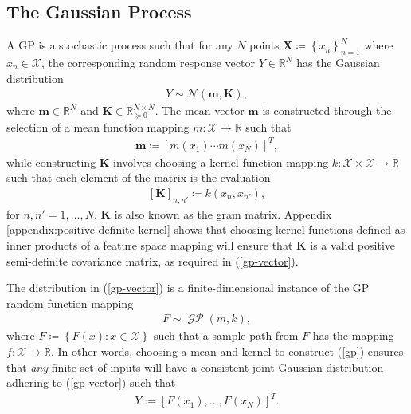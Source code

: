 \documentclass{article}
\newcommand{\GP}{\operatorname{\mathcal{GP}}}
\numberwithin{equation}{section}
\begin{document}
\subsection{The Gaussian Process}\label{section:the-gp}
A GP is a stochastic process such that for any $N$ points $\mathbf{X} \coloneqq \left\{ x_n\right\}_{n=1}^N$ where $x_n \in \mathcal{X}$, the corresponding random response vector $Y \in \mathbb{R}^N$ has the Gaussian distribution
\begin{align}
    \label{gp-vector}
    Y \sim \mathcal{N}\left(\mathbf{m}, \mathbf{K}\right),
\end{align}
where $\mathbf{m} \in \mathbb{R}^N$ and $\mathbf{K} \in  \mathbb{R}^{N \times N}_{\succcurlyeq 0}$.
The mean vector $\mathbf{m}$ is constructed through the selection of a mean function mapping $m: \mathcal{X} \rightarrow \mathbb{R}$ such that
\begin{align}
    \label{gp-mean-vector}
    \mathbf{m} \coloneqq \left[ m(x_1) \cdots m(x_N)\right]^T,
\end{align}
while constructing $\mathbf{K}$ involves choosing a kernel function mapping $k: \mathcal{X} \times \mathcal{X} \rightarrow \mathbb{R}$ such that each element of the matrix is the evaluation
\begin{align}
    \label{gp-kernel-matrix}
    \left[\mathbf{K}\right]_{n, n'} \coloneqq k(x_n, x_{n'}),
\end{align}
for $n, n'=1,\dots, N$.
$\mathbf{K}$ is also known as the gram matrix.
Appendix \ref{appendix:positive-definite-kernel} shows that choosing kernel functions defined as inner products of a feature space mapping will ensure that $\mathbf{K}$ is a valid positive semi-definite covariance matrix, as required in (\ref{gp-vector}).


The distribution in (\ref{gp-vector}) is a finite-dimensional instance of the GP random function mapping
\begin{align}
    F \sim \GP(m, k),
    \label{gp}
\end{align}
 where $F \coloneqq \left\{F(x): x \in \mathcal{X}\right\}$ such that a sample path from $F$ has the mapping $f: \mathcal{X} \rightarrow \mathbb{R}$.
In other words, choosing a mean and kernel to construct (\ref{gp}) ensures that \textit{any} finite set of inputs will have a consistent joint Gaussian distribution adhering to (\ref{gp-vector}) such that
\begin{align}
    Y:=\left[F(x_1),\hdots, F(x_N)\right]^T.
\end{align}
\end{document}
